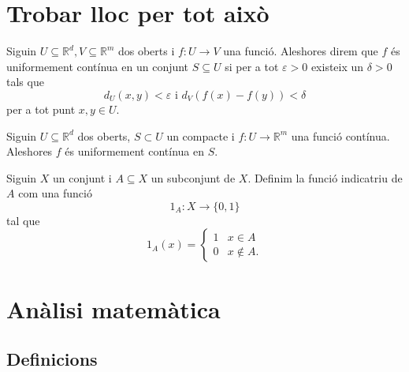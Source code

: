 \documentclass[../Apunts.tex]{subfiles}
\begin{document}
	\section{Trobar lloc per tot això}
	\begin{definition}
		\label{def:obert CDVO}
		\label{def:tancat CDVO}\label{conjunt obert, tancat...}\label{todo:conjunt definit per desigualtats estrictes és compacte}
	\end{definition}
	\begin{definition}
		\label{def:uniformement contínua}
		Siguin \(U\subseteq\mathbb{R}^{d},V\subseteq\mathbb{R}^{m}\) dos oberts i \(f\colon U\to V\) una funció. Aleshores direm que \(f\) és uniformement contínua en un conjunt \(S\subseteq U\) si per a tot \(\varepsilon>0\) existeix un \(\delta>0\) tals que
		\[d_{U}(x,y)<\varepsilon\text{ i }d_{V}(f(x)-f(y))<\delta\]
		per a tot punt \(x,y\in U\).
	\end{definition}
	\begin{theorem}
		\label{thm:Teorema de Heine}
		Siguin \(U\subseteq\mathbb{R}^{d}\) dos oberts, \(S\subset U\) un compacte i \(f\colon U\to\mathbb{R}^{m}\) una funció contínua. Aleshores \(f\) és uniformement contínua en \(S\). %
	\end{theorem}
	\begin{definition}
		\label{def:funció indicatriu}
		Siguin \(X\) un conjunt i \(A\subseteq X\) un subconjunt de \(X\). Definim la funció indicatriu de \(A\) com una funció
		\[1_{A}\colon X\longrightarrow\{0,1\}\]
		tal que
		\begin{displaymath}
		1_{A}(x)=\begin{cases}
		1 & x\in A \\
		0 & x\notin A.
		\end{cases}
		\end{displaymath}
	\end{definition}
	\section{Anàlisi matemàtica}
	\subsection{Definicions}
	\begin{definition}
		\label{def:convergència uniforme}
	\end{definition}
\end{document}
